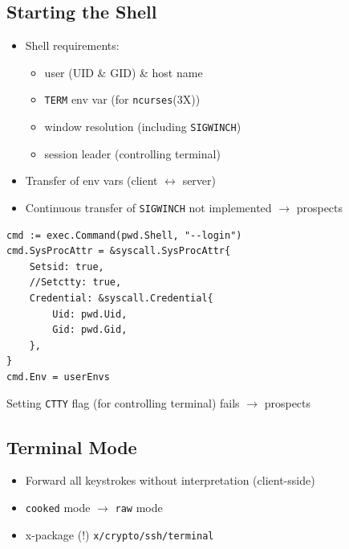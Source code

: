 \documentclass[
	xcolor=dvipsnames,
]{beamer}
\newenvironment{zhawframe}[1][]
{\begin{frame}[environment=fr,#1]{\insertsectionhead}{\insertsubsectionhead}}
{\end{frame}
}
\begin{document}
\subsection{Starting the Shell}
\begin{zhawframe}
\begin{itemize}
\item<1-> Shell requirements:
	\begin{itemize}
	\item user (UID \& GID) \& host name
	\item \texttt{TERM} env var (for \texttt{ncurses}(3X))
	\item window resolution (including \texttt{SIGWINCH})
	\item session leader (controlling terminal)
	\end{itemize}
\item<2-> Transfer of env vars (client $\leftrightarrow$ server)
\item<3-> Continuous transfer of \texttt{SIGWINCH} not implemented $\rightarrow$ prospects
\end{itemize}
\end{zhawframe}

\begin{frame}[fragile]{\insertsectionhead}{\insertsubsectionhead}
\lstset{
	style = basestyle,
	language = Golang,
}
\begin{lstlisting}
cmd := exec.Command(pwd.Shell, "--login")
cmd.SysProcAttr = &syscall.SysProcAttr{
    Setsid: true,
    //Setctty: true,
    Credential: &syscall.Credential{
        Uid: pwd.Uid,
        Gid: pwd.Gid,
    },
}
cmd.Env = userEnvs
\end{lstlisting}
 Setting \texttt{CTTY} flag (for controlling terminal) fails $\rightarrow$ prospects
\end{frame}

\subsection{Terminal Mode}
\begin{zhawframe}
\begin{itemize}
\item<1-> Forward all keystrokes without interpretation (client-sside)
\item<2-> \texttt{cooked} mode $\rightarrow$ \texttt{raw} mode
\item<3-> x-package (!) \texttt{x/crypto/ssh/terminal}
\end{itemize}
\end{zhawframe}
\end{document}
